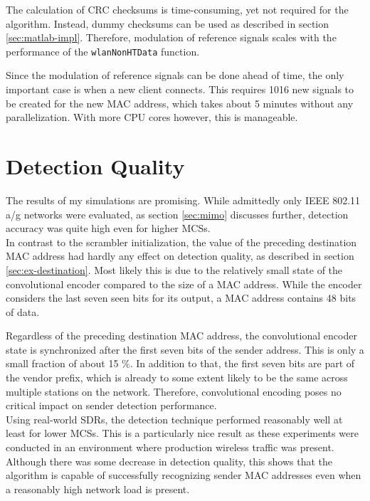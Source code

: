 The calculation of \gls{CRC} checksums is time-consuming, yet not required for the algorithm. Instead, dummy checksums can be used as described in section \ref{sec:matlab-impl}. Therefore, modulation of reference signals scales with the performance of the \texttt{wlanNonHTData} function.

Since the modulation of reference signals can be done ahead of time, the only important case is when a new client connects. This requires 1016 new signals to be created for the new \gls{MAC} address, which takes about 5 minutes without any parallelization. With more CPU cores however, this is manageable.



\section{Detection Quality}\label{sec:detection-quality}

The results of my simulations are promising. While admittedly only IEEE 802.11 a/g networks were evaluated, as section \ref{sec:mimo} discusses further, detection accuracy was quite high even for higher \glspl{MCS}.\\

In contrast to the scrambler initialization, the value of the preceding destination \gls{MAC} address had hardly any effect on detection quality, as described in section \ref{sec:ex-destination}. Most likely this is due to the relatively small state of the convolutional encoder compared to the size of a \gls{MAC} address. While the encoder considers the last seven seen bits for its output, a \gls{MAC} address contains 48 bits of data.

Regardless of the preceding destination \gls{MAC} address, the convolutional encoder state is synchronized after the first seven bits of the sender address. This is only a small fraction of about 15 \%. In addition to that, the first seven bits are part of the vendor prefix, which is already to some extent likely to be the same across multiple stations on the network. Therefore, convolutional encoding poses no critical impact on sender detection performance.\\

Using real-world \glspl{SDR}, the detection technique performed reasonably well at least for lower \glspl{MCS}. This is a particularly nice result as these experiments were conducted in an environment where production wireless traffic was present. Although there was some decrease in detection quality, this shows that the algorithm is capable of successfully recognizing sender \gls{MAC} addresses even when a reasonably high network load is present.


